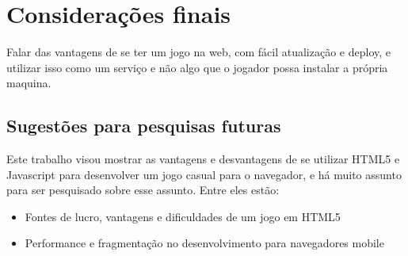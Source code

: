 \section{Considerações finais}

Falar das vantagens de se ter um jogo na web, com fácil atualização e
deploy, e utilizar isso como um serviço e não algo que o jogador possa
instalar a própria maquina.

\subsection{Sugestões para pesquisas futuras}

Este trabalho visou mostrar as vantagens e desvantagens de se utilizar
HTML5 e Javascript para desenvolver um jogo casual para o navegador,
e há muito assunto para ser pesquisado sobre esse assunto. Entre eles
estão:

\begin{itemize}
    \item Fontes de lucro, vantagens e dificuldades de um jogo em HTML5
    \item Performance e fragmentação no desenvolvimento para navegadores mobile
\end{itemize}
